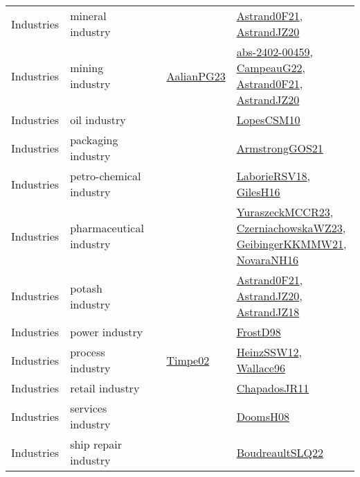 {\begin{longtable}{lp{3cm}>{\raggedright}p{6cm}>{\raggedright}p{6cm}p{8cm}}
Industries & mineral industry &  &  & \href{papers/Astrand0F21.pdf}{Astrand0F21}\cite{Astrand0F21}, \href{articles/AstrandJZ20.pdf}{AstrandJZ20}\cite{AstrandJZ20}\\
Industries & mining industry &  & \href{papers/AalianPG23.pdf}{AalianPG23}\cite{AalianPG23} & \href{articles/abs-2402-00459.pdf}{abs-2402-00459}\cite{abs-2402-00459}, \href{articles/CampeauG22.pdf}{CampeauG22}\cite{CampeauG22}, \href{papers/Astrand0F21.pdf}{Astrand0F21}\cite{Astrand0F21}, \href{articles/AstrandJZ20.pdf}{AstrandJZ20}\cite{AstrandJZ20}\\
Industries & oil industry &  &  & \href{articles/LopesCSM10.pdf}{LopesCSM10}\cite{LopesCSM10}\\
Industries & packaging industry &  &  & \href{papers/ArmstrongGOS21.pdf}{ArmstrongGOS21}\cite{ArmstrongGOS21}\\
Industries & petro-chemical industry &  &  & \href{articles/LaborieRSV18.pdf}{LaborieRSV18}\cite{LaborieRSV18}, \href{papers/GilesH16.pdf}{GilesH16}\cite{GilesH16}\\
Industries & pharmaceutical industry &  &  & \href{articles/YuraszeckMCCR23.pdf}{YuraszeckMCCR23}\cite{YuraszeckMCCR23}, \href{articles/CzerniachowskaWZ23.pdf}{CzerniachowskaWZ23}\cite{CzerniachowskaWZ23}, \href{papers/GeibingerKKMMW21.pdf}{GeibingerKKMMW21}\cite{GeibingerKKMMW21}, \href{articles/NovaraNH16.pdf}{NovaraNH16}\cite{NovaraNH16}\\
Industries & potash industry &  &  & \href{papers/Astrand0F21.pdf}{Astrand0F21}\cite{Astrand0F21}, \href{articles/AstrandJZ20.pdf}{AstrandJZ20}\cite{AstrandJZ20}, \href{papers/AstrandJZ18.pdf}{AstrandJZ18}\cite{AstrandJZ18}\\
Industries & power industry &  &  & \href{papers/FrostD98.pdf}{FrostD98}\cite{FrostD98}\\
Industries & process industry &  & \href{articles/Timpe02.pdf}{Timpe02}\cite{Timpe02} & \href{articles/HeinzSSW12.pdf}{HeinzSSW12}\cite{HeinzSSW12}, \href{articles/Wallace96.pdf}{Wallace96}\cite{Wallace96}\\
Industries & retail industry &  &  & \href{papers/ChapadosJR11.pdf}{ChapadosJR11}\cite{ChapadosJR11}\\
Industries & services industry &  &  & \href{papers/DoomsH08.pdf}{DoomsH08}\cite{DoomsH08}\\
Industries & ship repair industry &  &  & \href{papers/BoudreaultSLQ22.pdf}{BoudreaultSLQ22}\cite{BoudreaultSLQ22}\\

\end{longtable}}
